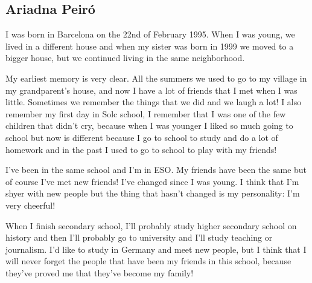%
%
\subsection*{Ariadna Peiró}

I was born in Barcelona on the 22nd of February 1995. When I was young, we lived in a different house and when my sister was born in 1999 we moved to a bigger house, but we continued living in the same neighborhood.

My earliest memory is very clear. All the summers we used to go to my village in my grandparent’s house, and now I have a lot of friends that I met when I was little. Sometimes we remember the things that we did and we laugh a lot! I also remember my first day in Solc school, I remember that I was one of the few children that didn’t cry, because when I was younger I liked so much going to school but now is different because I go to school to study and do a lot of homework and in the past I used to go to school to play with my friends!

I’ve been in the same school and I’m in ESO. My friends have been the same but of course I’ve met new friends! I’ve changed since I was young. I think that I’m shyer with new people but the thing that hasn’t changed is my personality: I’m very cheerful!

When I finish secondary school, I’ll probably study higher secondary school on history and then I’ll probably go to university and I’ll study teaching or journalism. I’d like to study in Germany and meet new people, but I think that I will never forget the people that have been my friends in this school, because they’ve proved me that they’ve become my family!



